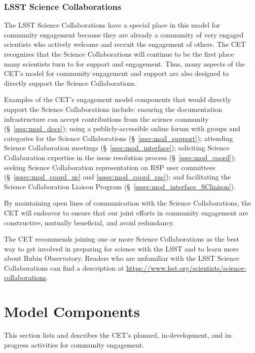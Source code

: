 \documentclass[DM,lsstdraft,toc]{lsstdoc}
\begin{document}
\subsubsection{LSST Science Collaborations}\label{sssec:intro_comms_scicoll}

The LSST Science Collaborations have a special place in this model for community engagement because they are already a community of very engaged scientists who actively welcome and recruit the engagement of others.
The CET recognizes that the Science Collaborations will continue to be the first place many scientists turn to for support and engagement.
Thus, many aspects of the CET's model for community engagement and support are also designed to directly support the Science Collaborations.

Examples of the CET's engagement model components that would directly support the Science Collaborations include: ensuring the documentation infrastructure can accept contributions from the science community (\S~\ref{ssec:mod_docs}); using a publicly-accessible online forum with groups and categories for the Science Collaborations (\S~\ref{ssec:mod_support}); attending Science Collaboration meetings (\S~\ref{ssec:mod_interface}); soliciting Science Collaboration expertise in the issue resolution process (\S~\ref{ssec:mod_coord}); seeking Science Collaboration representation on RSP user committees (\S~\ref{sssec:mod_coord_uc} and \ref{sssec:mod_coord_rac}); and facilitating the Science Collaboration Liaison Program (\S~\ref{sssec:mod_interface_SCliaison}).

By maintaining open lines of communication with the Science Collaborations, the CET will endeavor to ensure that our joint efforts in community engagement are constructive, mutually beneficial, and avoid redundancy.

The CET recommends joining one or more Science Collaborations as the best way to get involved in preparing for science with the LSST and to learn more about Rubin Observatory.
Readers who are unfamiliar with the LSST Science Collaborations can find a description at \url{https://www.lsst.org/scientists/science-collaborations}.



\section{Model Components}\label{sec:mod}

This section lists and describes the CET's planned, in-development, and in-progress activities for community engagement. 
\end{document}
